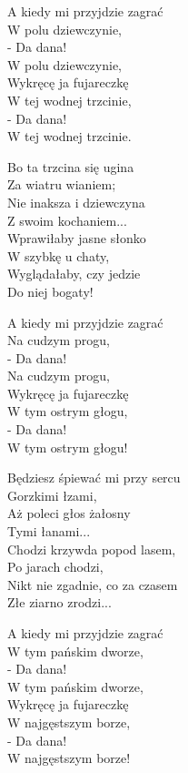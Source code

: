 \begin{text}
    \hfill\break
A kiedy mi przyjdzie zagrać\\
W polu dziewczynie,\\
- Da dana!\\
W polu dziewczynie,\\
Wykręcę ja fujareczkę\\
W tej wodnej trzcinie,\\
- Da dana!\\
W tej wodnej trzcinie.

Bo ta trzcina się ugina\\
Za wiatru wianiem;\\
Nie inaksza i dziewczyna\\
Z swoim kochaniem...\\
Wprawiłaby jasne słonko\\
W szybkę u chaty,\\
Wyglądałaby, czy jedzie\\
Do niej bogaty!

A kiedy mi przyjdzie zagrać\\
Na cudzym progu,\\
- Da dana!\\
Na cudzym progu,\\
Wykręcę ja fujareczkę\\
W tym ostrym głogu,\\
- Da dana!\\
W tym ostrym głogu!

Będziesz śpiewać mi przy sercu\\
Gorzkimi łzami,\\
Aż poleci głos żałosny\\
Tymi łanami...\\
Chodzi krzywda popod lasem,\\
Po jarach chodzi,\\
Nikt nie zgadnie, co za czasem\\
Złe ziarno zrodzi...

A kiedy mi przyjdzie zagrać\\
W tym pańskim dworze,\\
- Da dana!\\
W tym pańskim dworze,\\
Wykręcę ja fujareczkę\\
W najgęstszym borze,\\
- Da dana!\\
W najgęstszym borze!
\end{text}
